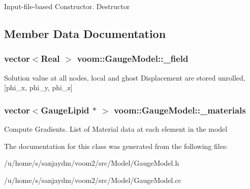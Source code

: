 Input-\/file-\/based Constructor. Destructor 

\subsection{Member Data Documentation}
\hypertarget{classvoom_1_1_gauge_model_a1d12d980a564a66d76235b3bc8e3eb5c}{
\subsubsection[{\_\-field}]{\setlength{\rightskip}{0pt plus 5cm}vector$<$Real $>$ {\bf voom::GaugeModel::\_\-field}}}
\label{classvoom_1_1_gauge_model_a1d12d980a564a66d76235b3bc8e3eb5c}
Solution value at all nodes, local and ghost Displacement are stored unrolled, \mbox{[}phi\_\-x, phi\_\-y, phi\_\-z\mbox{]} \hypertarget{classvoom_1_1_gauge_model_a68fb6771675d320ae7e850b09fb487e4}{
\subsubsection[{\_\-materials}]{\setlength{\rightskip}{0pt plus 5cm}vector$<${\bf GaugeLipid} $\ast$ $>$ {\bf voom::GaugeModel::\_\-materials}}}
\label{classvoom_1_1_gauge_model_a68fb6771675d320ae7e850b09fb487e4}


Compute Gradients. List of Material data at each element in the model 

The documentation for this class was generated from the following files:\begin{DoxyCompactItemize}
\item 
/u/home/s/sanjaydm/voom2/src/Model/GaugeModel.h\item 
/u/home/s/sanjaydm/voom2/src/Model/GaugeModel.cc\end{DoxyCompactItemize}
